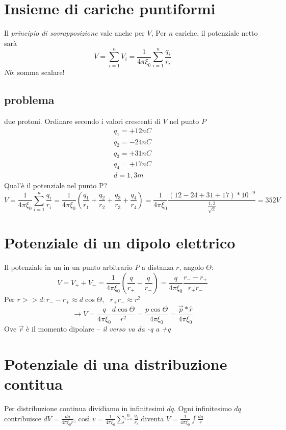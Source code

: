 \documentclass{book}
\begin{document}
\section{Insieme di cariche puntiformi}
Il \textit{principio di sovrapposizione} vale anche per $V$, Per $n$ cariche, il potenziale netto sarà
\begin{equation}
  V=\sum_{i=1}^{n}V_i=\frac{1}{4\pi \xi_0}\sum_{i=1}^{n}\frac{q_i}{r_i}
\end{equation}
$Nb$: somma scalare!
\subsection{problema}
due protoni. Ordinare secondo i valori crescenti di $V$ nel punto $P$
\begin{equation}
  \begin{matrix}
    q_1=+12nC\\
    q_2=-24nC\\
    q_3=+31nC\\
    q_4=+17nC\\
    d=1,3m
  \end{matrix}
\end{equation}
Qual'è il potenziale nel punto P?
\begin{equation}
  V=\frac{1}{4\pi \xi_0}\sum_{i=1}^{n}\frac{q_i}{r_i}=
  \frac{1}{4\pi\xi_0}\left(\frac{q_1}{r_1}+\frac{q_2}{r_2}+\frac{q_3}{r_3}
    +\frac{q_4}{r_4}\right)=\frac{1}{4\pi\xi_0}
  \frac{(12-24+31+17)*10^{-9}}{\frac{1,3}{\sqrt{2}}}=352V
\end{equation}
\section{Potenziale di un dipolo elettrico}
Il potenziale in un in un punto arbitrario $P$ a distanza $r$, angolo $\Theta$:
\begin{equation}
  V=V_++V_- =\frac{1}{4\pi\xi_0}\left(\frac{q}{r_+} - \frac{q}{r_-}\right)=
  \frac{q}{4\pi\xi_0}\frac{r_--r_+}{r_+r_-}
\end{equation}
Per $r>>d:r_--r_+\approx d \cos\Theta,\text{ } r_+r_-\approx r^2$
\begin{equation*}
  \to V = \frac{q}{4\pi\xi_0}\frac{d\cos \Theta}{r^2}=\frac{p\cos\Theta}{4\pi\xi_0}=
  \frac{\overrightarrow{p}*\hat{r}}{4\pi\xi_0}
\end{equation*}
Ove $\overrightarrow{r}$ è il momento dipolare -- \textit{\color{blue}il verso va da -q a +q}
\section{Potenziale di una distribuzione contitua}
Per distribuzione continua dividiamo in infinitesimi $dq$. Ogni infinitesimo $dq$ contribuisce $dV=\frac{dq}{4\pi\xi_0r}$, così $v=\frac{1}{4\pi\xi_0}\sum^n\limits_{i=0}\frac{q_i}{r_i}$ diventa $V=\frac{1}{4\pi\xi_0}\int \frac{dq}{r}$
\end{document}

